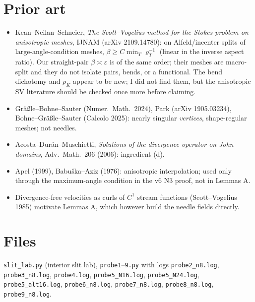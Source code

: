 \documentclass[11pt]{article}
\theoremstyle{remark}
\begin{document}
\section{Prior art}
\begin{itemize}
\item Kean--Neilan--Schneier, \emph{The Scott--Vogelius method for the Stokes problem on anisotropic meshes}, IJNAM (arXiv 2109.14780): on Alfeld/incenter
splits of large-angle-condition meshes, $\beta\ge C\min_T\varrho_T^{-1}$ (linear in the inverse aspect ratio). Our straight-pair $\beta\asymp\varepsilon$ is of the
same order; their meshes are macro-split and they do not isolate pairs, bends, or a functional. The bend dichotomy and $\rho_K$ appear to be new; I did not
find them, but the anisotropic SV literature should be checked once more before claiming.
\item Gr\"a\ss le--Bohne--Sauter (Numer.\ Math.\ 2024), Park (arXiv 1905.03234), Bohne--Gr\"a\ss le--Sauter (Calcolo 2025): nearly singular \emph{vertices},
shape-regular meshes; not needles.
\item Acosta--Dur\'an--Muschietti, \emph{Solutions of the divergence operator on John domains}, Adv.\ Math.\ 206 (2006): ingredient (d).
\item Apel (1999), Babu\v ska--Aziz (1976): anisotropic interpolation; used only through the maximum-angle condition in the v6 N3 proof, not in Lemmas A.
\item Divergence-free velocities as curls of $C^1$ stream functions (Scott--Vogelius 1985) motivate Lemmas A, which however build the needle fields directly.
\end{itemize}

\section*{Files}
\texttt{slit\_lab.py} (interior slit lab), \texttt{probe1}--\texttt{9.py} with logs \texttt{probe2\_n8.log}, \texttt{probe3\_n8.log}, \texttt{probe4.log},
\texttt{probe5\_N16.log}, \texttt{probe5\_N24.log}, \texttt{probe5\_alt16.log}, \texttt{probe6\_n8.log}, \texttt{probe7\_n8.log}, \texttt{probe8\_n8.log}, \texttt{probe9\_n8.log}.
\end{document}
